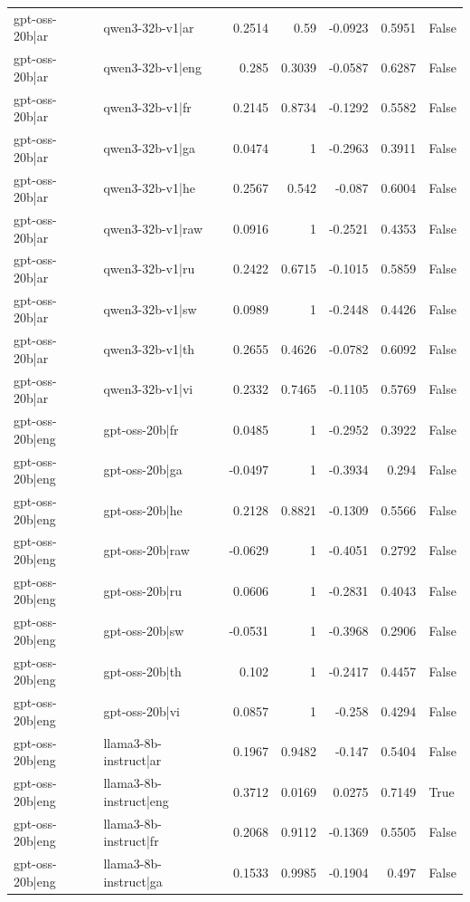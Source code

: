 \begin{table}
\begin{tabular}{l l r r r r l}
gpt-oss-20b|ar & qwen3-32b-v1|ar & 0.2514 & 0.59 & -0.0923 & 0.5951 & False \\
gpt-oss-20b|ar & qwen3-32b-v1|eng & 0.285 & 0.3039 & -0.0587 & 0.6287 & False \\
gpt-oss-20b|ar & qwen3-32b-v1|fr & 0.2145 & 0.8734 & -0.1292 & 0.5582 & False \\
gpt-oss-20b|ar & qwen3-32b-v1|ga & 0.0474 & 1 & -0.2963 & 0.3911 & False \\
gpt-oss-20b|ar & qwen3-32b-v1|he & 0.2567 & 0.542 & -0.087 & 0.6004 & False \\
gpt-oss-20b|ar & qwen3-32b-v1|raw & 0.0916 & 1 & -0.2521 & 0.4353 & False \\
gpt-oss-20b|ar & qwen3-32b-v1|ru & 0.2422 & 0.6715 & -0.1015 & 0.5859 & False \\
gpt-oss-20b|ar & qwen3-32b-v1|sw & 0.0989 & 1 & -0.2448 & 0.4426 & False \\
gpt-oss-20b|ar & qwen3-32b-v1|th & 0.2655 & 0.4626 & -0.0782 & 0.6092 & False \\
gpt-oss-20b|ar & qwen3-32b-v1|vi & 0.2332 & 0.7465 & -0.1105 & 0.5769 & False \\
gpt-oss-20b|eng & gpt-oss-20b|fr & 0.0485 & 1 & -0.2952 & 0.3922 & False \\
gpt-oss-20b|eng & gpt-oss-20b|ga & -0.0497 & 1 & -0.3934 & 0.294 & False \\
gpt-oss-20b|eng & gpt-oss-20b|he & 0.2128 & 0.8821 & -0.1309 & 0.5566 & False \\
gpt-oss-20b|eng & gpt-oss-20b|raw & -0.0629 & 1 & -0.4051 & 0.2792 & False \\
gpt-oss-20b|eng & gpt-oss-20b|ru & 0.0606 & 1 & -0.2831 & 0.4043 & False \\
gpt-oss-20b|eng & gpt-oss-20b|sw & -0.0531 & 1 & -0.3968 & 0.2906 & False \\
gpt-oss-20b|eng & gpt-oss-20b|th & 0.102 & 1 & -0.2417 & 0.4457 & False \\
gpt-oss-20b|eng & gpt-oss-20b|vi & 0.0857 & 1 & -0.258 & 0.4294 & False \\
gpt-oss-20b|eng & llama3-8b-instruct|ar & 0.1967 & 0.9482 & -0.147 & 0.5404 & False \\
gpt-oss-20b|eng & llama3-8b-instruct|eng & 0.3712 & 0.0169 & 0.0275 & 0.7149 & True \\
gpt-oss-20b|eng & llama3-8b-instruct|fr & 0.2068 & 0.9112 & -0.1369 & 0.5505 & False \\
gpt-oss-20b|eng & llama3-8b-instruct|ga & 0.1533 & 0.9985 & -0.1904 & 0.497 & False \\

\end{tabular}
\end{table}
